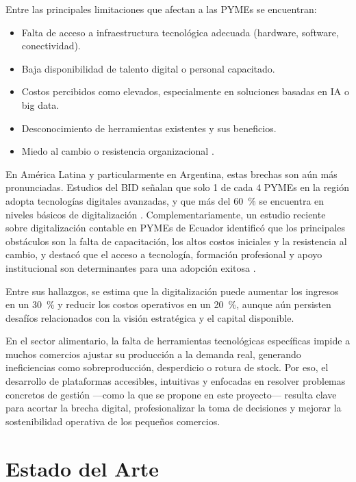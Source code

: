 Entre las principales limitaciones que afectan a las PYMEs se encuentran:

\begin{itemize}
    \item Falta de acceso a infraestructura tecnológica adecuada (hardware, software, conectividad).
    \item Baja disponibilidad de talento digital o personal capacitado.
    \item Costos percibidos como elevados, especialmente en soluciones basadas en IA o big data.
    \item Desconocimiento de herramientas existentes y sus beneficios.
    \item Miedo al cambio o resistencia organizacional \parencite{jordao2022}.
\end{itemize}

En América Latina y particularmente en Argentina, estas brechas son aún más pronunciadas. Estudios del BID señalan que solo 1 de cada 4 PYMEs en la región adopta tecnologías digitales avanzadas, y que más del 60~\% se encuentra en niveles básicos de digitalización \parencite{bid2020}. Complementariamente, un estudio reciente sobre digitalización contable en PYMEs de Ecuador identificó que los principales obstáculos son la falta de capacitación, los altos costos iniciales y la resistencia al cambio, y destacó que el acceso a tecnología, formación profesional y apoyo institucional son determinantes para una adopción exitosa \parencite{vasconez2025}.

Entre sus hallazgos, se estima que la digitalización puede aumentar los ingresos en un 30~\% y reducir los costos operativos en un 20~\%, aunque aún persisten desafíos relacionados con la visión estratégica y el capital disponible.

En el sector alimentario, la falta de herramientas tecnológicas específicas impide a muchos comercios ajustar su producción a la demanda real, generando ineficiencias como sobreproducción, desperdicio o rotura de stock. Por eso, el desarrollo de plataformas accesibles, intuitivas y enfocadas en resolver problemas concretos de gestión —como la que se propone en este proyecto— resulta clave para acortar la brecha digital, profesionalizar la toma de decisiones y mejorar la sostenibilidad operativa de los pequeños comercios.

\newpage %

\section{Estado del Arte}

